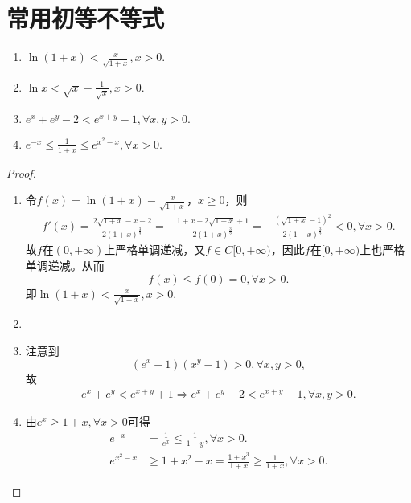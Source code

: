 \documentclass[../../main.tex]{subfiles}
\begin{document}
\section{常用初等不等式}

\begin{proposition}[常用不等式]\label{proposition:常用不等式}
\begin{enumerate}[(1)]
\item\label{proposition:常用不等式1} $\ln \left( 1+x \right) <\frac{x}{\sqrt{1+x}},x>0.$

\item \label{proposition:常用不等式2} $\ln x<\sqrt{x}-\frac{1}{\sqrt{x}},x>0.$

\item \label{proposition:常用不等式3} $e^x+e^y-2<e^{x+y}-1,\forall x,y>0.$

\item \label{proposition:常用不等式4} $e^{-x}\leqslant \frac{1}{1+x}\leqslant e^{x^2-x},\forall x>0.$
\end{enumerate}
\end{proposition}
\begin{proof}
\begin{enumerate}[(1)]
\item 令\(f(x)=\ln(1 + x)-\frac{x}{\sqrt{1 + x}}\)，\(x\geqslant 0\)，则
\begin{align*}
f'\left( x \right) =\frac{2\sqrt{1+x}-x-2}{2\left( 1+x \right) ^{\frac{3}{2}}}=-\frac{1+x-2\sqrt{1+x}+1}{2\left( 1+x \right) ^{\frac{3}{2}}}=-\frac{\left( \sqrt{1+x}-1 \right) ^2}{2\left( 1+x \right) ^{\frac{3}{2}}}<0,\forall x>0.
\end{align*}
故\(f\)在\((0,+\infty)\)上严格单调递减，又\(f\in C[0,+\infty)\)，因此\(f\)在\([0,+\infty)\)上也严格单调递减。从而
\[
f(x)\leqslant f(0)=0,\forall x>0.
\]
即\(\ln(1 + x)<\frac{x}{\sqrt{1 + x}},x>0\).

\item 

\item 注意到
\[
(e^x-1)(x^y-1)>0,\forall x,y>0,
\]
故
\begin{align*}
e^x+e^y<e^{x+y}+1\Longrightarrow e^x+e^y-2<e^{x+y}-1,\forall x,y>0.
\end{align*}

\item 由$e^x\geqslant 1+x,\forall x>0$可得
\begin{align*}
e^{-x}&=\frac{1}{e^x}\leqslant \frac{1}{1+y},\forall x>0.
\\
e^{x^2-x}&\geqslant 1+x^2-x=\frac{1+x^3}{1+x}\geqslant \frac{1}{1+x},\forall x>0.
\end{align*}
\end{enumerate}
\end{proof}
\end{document}
